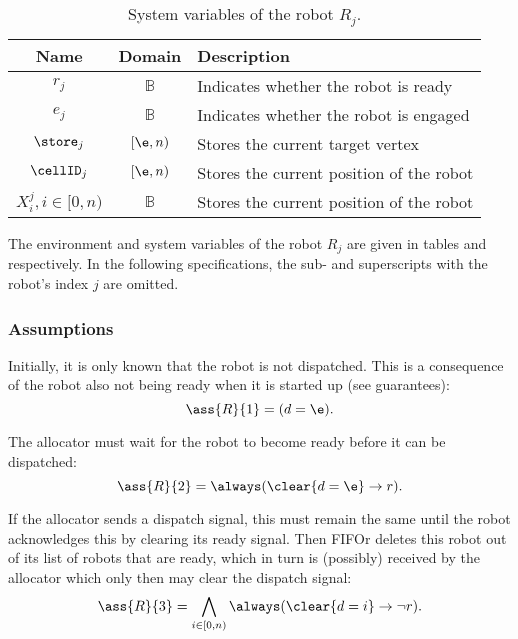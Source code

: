 \begin{table}
\centering
\begin{tabular}{c|c|l}
\hline
Name & Domain & Description \\
\hline
$r_j$ & $\mathbb{B}$ & Indicates whether the robot is ready \\
$e_j$ & $\mathbb{B}$ & Indicates whether the robot is engaged \\
$\store_j$ & $[\e, n)$ & Stores the current target vertex \\
$\cellID_j$ & $[\e, n)$ & Stores the current position of the robot \\
$X^j_i, i \in [0, n)$ & $\mathbb{B}$ & Stores the current position of the robot \\
\hline
\end{tabular}
\caption{System variables of the robot $R_j$.}
\label{tab:sys:robot}
\end{table}

The environment and system variables of the robot $R_j$ are given in tables  and  respectively. In the following specifications, the sub- and superscripts with the robot's index $j$ are omitted.

\subsubsection{Assumptions}

Initially, it is only known that the robot is not dispatched. This is a consequence of the robot also not being ready when it is started up (see guarantees):
\begin{equation*}
    \ass{R}{1} = (d=\e).
\end{equation*}

The allocator must wait for the robot to become ready before it can be dispatched:
\begin{equation*}
    \ass{R}{2} = \always(\clear{d=\e} \rightarrow r).
\end{equation*}

If the allocator sends a dispatch signal, this must remain the same until the robot acknowledges this by clearing its ready signal. Then FIFOr deletes this robot out of its list of robots that are ready, which in turn is (possibly) received by the allocator which only then may clear the dispatch signal:
\begin{equation*}
    \ass{R}{3} = \bigwedge_{i \in [0, n)} \always(\clear{d=i} \rightarrow \neg r).
\end{equation*}


